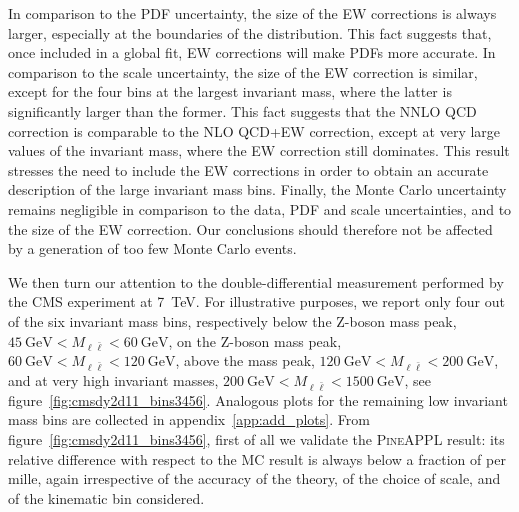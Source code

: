 In comparison to the PDF uncertainty, the size of the EW corrections is
always larger, especially at the boundaries of the distribution. This fact
suggests that, once included in a global fit, EW corrections will make PDFs
more accurate. In comparison to the scale
uncertainty, the size of the EW correction is similar, except for the four bins
at the largest invariant mass, where the latter is significantly larger than
the former. This fact suggests that the NNLO QCD correction is comparable
to the NLO QCD+EW correction, except at very large values of the invariant mass,
where the EW correction still dominates. This result stresses the need to
include the EW corrections in order to obtain an accurate description of the
large invariant mass bins. Finally, the Monte Carlo 
uncertainty remains negligible in comparison to the data, PDF and scale
uncertainties, and to the size of the EW correction. Our conclusions should
therefore not be affected by a generation of too few Monte Carlo events.

We then turn our attention to the double-differential measurement performed by
the CMS experiment at \SI{7}{\tera\electronvolt}. For illustrative purposes, we report only four out
of the six invariant mass bins, respectively below the Z-boson mass peak,
$\SI{45}{\giga\electronvolt}<M_{\ell\bar\ell}<\SI{60}{\giga\electronvolt}$, on the Z-boson mass peak,
$\SI{60}{\giga\electronvolt}<M_{\ell\bar\ell}<\SI{120}{\giga\electronvolt}$, above the mass peak,
$\SI{120}{\giga\electronvolt}<M_{\ell\bar\ell}<\SI{200}{\giga\electronvolt}$, and at very high invariant masses,
$\SI{200}{\giga\electronvolt}<M_{\ell\bar\ell}<\SI{1500}{\giga\electronvolt}$, see figure~\ref{fig:cmsdy2d11_bins3456}.
Analogous plots for the remaining low invariant mass bins are collected in
appendix~\ref{app:add_plots}. From figure~\ref{fig:cmsdy2d11_bins3456},
first of all we validate the \textsc{PineAPPL} result: its relative difference
with respect to the MC result is always below a fraction of per mille,
again irrespective of the accuracy of the theory, of the choice of scale, and
of the kinematic bin considered. 

